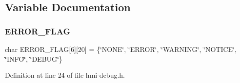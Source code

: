 \subsection{Variable Documentation}
\mbox{\label{hmi-debug_8h_a13d4c7647aad2e84766f8b48a6caab09}} 
\subsubsection{\texorpdfstring{E\+R\+R\+O\+R\+\_\+\+F\+L\+AG}{ERROR\_FLAG}}
{\footnotesize\ttfamily char E\+R\+R\+O\+R\+\_\+\+F\+L\+AG\mbox{[}6\mbox{]}\mbox{[}20\mbox{]} = \{\char`\"{}N\+O\+NE\char`\"{}, \char`\"{}E\+R\+R\+OR\char`\"{}, \char`\"{}W\+A\+R\+N\+I\+NG\char`\"{}, \char`\"{}N\+O\+T\+I\+CE\char`\"{}, \char`\"{}I\+N\+FO\char`\"{}, \char`\"{}D\+E\+B\+UG\char`\"{}\}\hspace{0.3cm}{\ttfamily [static]}}



Definition at line 24 of file hmi-\/debug.\+h.

